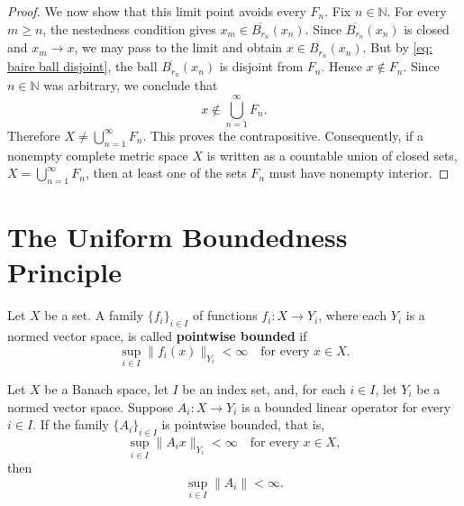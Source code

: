 \begin{proof}
    We now show that this limit point avoids every \(F_n\). Fix \(n \in \mathbb{N}\). For every \(m \geq n\), the nestedness condition gives \(x_m \in \overline{B_{r_n}}(x_n)\). Since \(\overline{B_{r_n}}(x_n)\) is closed and \(x_m \to x\), we may pass to the limit and obtain \(x \in \overline{B_{r_n}}(x_n)\). But by \autoref{eq: baire ball disjoint}, the ball \(\overline{B_{r_n}}(x_n)\) is disjoint from \(F_n\). Hence \(x \notin F_n\). Since \(n \in \mathbb{N}\) was arbitrary, we conclude that
    \[
        x \notin \bigcup_{n=1}^{\infty} F_n.
    \]
    Therefore \(X \neq \bigcup_{n=1}^{\infty} F_n\). This proves the contrapositive. Consequently, if a nonempty complete metric space \(X\) is written as a countable union of closed sets, \(X = \bigcup_{n=1}^{\infty} F_n\), then at least one of the sets \(F_n\) must have nonempty interior.
\end{proof}

\section{The Uniform Boundedness Principle}
Let \(X\) be a set. A family \(\{f_i\}_{i \in I}\) of functions \(f_i : X \to Y_i\), where each \(Y_i\) is a normed vector space, is called \textbf{pointwise bounded} if
\[
    \sup_{i \in I} \lVert f_i(x) \rVert_{Y_i} < \infty \quad \text{for every } x \in X.
\]

\begin{theorem} \label{thm: uniform boundedness principle}
    Let \(X\) be a Banach space, let \(I\) be an index set, and, for each \(i \in I\), let \(Y_i\) be a normed vector space. Suppose \(A_i : X \to Y_i\) is a bounded linear operator for every \(i \in I\). If the family \(\{A_i\}_{i \in I}\) is pointwise bounded, that is,
    \[
        \sup_{i \in I} \lVert A_i x \rVert_{Y_i} < \infty \quad \text{for every } x \in X,
    \]
    then
    \[
        \sup_{i \in I} \lVert A_i \rVert < \infty.
    \]
\end{theorem}

